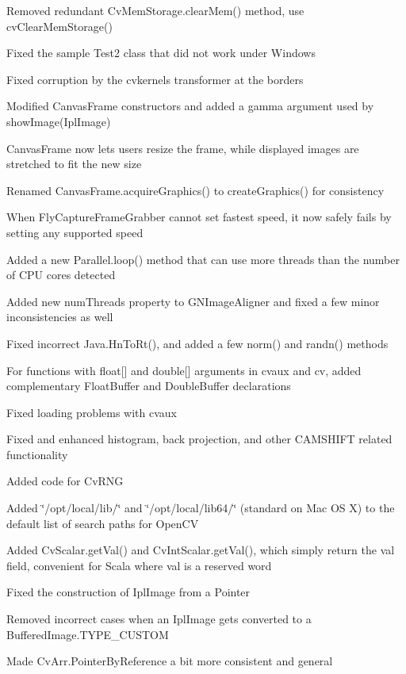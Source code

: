 \begin{DoxyItemize}
\item Removed redundant {\ttfamily Cv\+Mem\+Storage.\+clear\+Mem()} method, use {\ttfamily cv\+Clear\+Mem\+Storage()}
\item Fixed the sample {\ttfamily Test2} class that did not work under Windows
\item Fixed corruption by the {\ttfamily cvkernels} {\ttfamily transformer} at the borders
\item Modified {\ttfamily Canvas\+Frame} constructors and added a {\ttfamily gamma} argument used by {\ttfamily show\+Image(\+Ipl\+Image)}
\item {\ttfamily Canvas\+Frame} now lets users resize the frame, while displayed images are stretched to fit the new size
\item Renamed {\ttfamily Canvas\+Frame.\+acquire\+Graphics()} to {\ttfamily create\+Graphics()} for consistency
\item When {\ttfamily Fly\+Capture\+Frame\+Grabber} cannot set fastest speed, it now safely fails by setting any supported speed
\item Added a new {\ttfamily Parallel.\+loop()} method that can use more threads than the number of C\+P\+U cores detected
\item Added new {\ttfamily num\+Threads} property to {\ttfamily G\+N\+Image\+Aligner} and fixed a few minor inconsistencies as well
\item Fixed incorrect {\ttfamily Java.\+Hn\+To\+Rt()}, and added a few {\ttfamily norm()} and {\ttfamily randn()} methods
\item For functions with {\ttfamily float\mbox{[}\mbox{]}} and {\ttfamily double\mbox{[}\mbox{]}} arguments in {\ttfamily cvaux} and {\ttfamily cv}, added complementary {\ttfamily Float\+Buffer} and {\ttfamily Double\+Buffer} declarations
\item Fixed loading problems with {\ttfamily cvaux}
\item Fixed and enhanced histogram, back projection, and other C\+A\+M\+S\+H\+I\+F\+T related functionality
\item Added code for {\ttfamily Cv\+R\+N\+G}
\item Added \char`\"{}/opt/local/lib/\char`\"{} and \char`\"{}/opt/local/lib64/\char`\"{} (standard on Mac O\+S X) to the default list of search paths for Open\+C\+V
\item Added {\ttfamily Cv\+Scalar.\+get\+Val()} and {\ttfamily Cv\+Int\+Scalar.\+get\+Val()}, which simply return the {\ttfamily val} field, convenient for Scala where {\ttfamily val} is a reserved word
\item Fixed the construction of {\ttfamily Ipl\+Image} from a {\ttfamily Pointer}
\item Removed incorrect cases when an {\ttfamily Ipl\+Image} gets converted to a {\ttfamily Buffered\+Image.\+T\+Y\+P\+E\+\_\+\+C\+U\+S\+T\+O\+M}
\item Made {\ttfamily Cv\+Arr.\+Pointer\+By\+Reference} a bit more consistent and general
\end{DoxyItemize}

